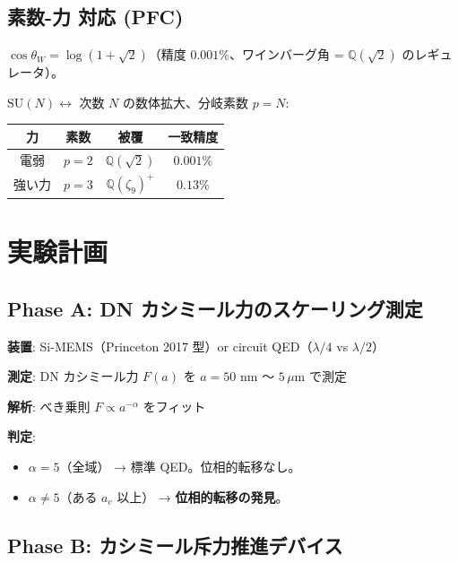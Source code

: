 \documentclass[11pt,a4paper]{article}
\begin{document}
\subsection{素数-力 対応 (PFC)}

\begin{resultbox}[数値的発見]
$\cos\theta_W = \log(1+\sqrt{2})$（精度 $0.001\%$、ワインバーグ角 = $\mathbb{Q}(\sqrt{2})$ のレギュレータ）。

$\mathrm{SU}(N) \leftrightarrow$ 次数 $N$ の数体拡大、分岐素数 $p = N$:
\begin{center}
\begin{tabular}{cccc}
\toprule
力 & 素数 & 被覆 & 一致精度 \\
\midrule
電弱 & $p=2$ & $\mathbb{Q}(\sqrt{2})$ & $0.001\%$ \\
強い力 & $p=3$ & $\mathbb{Q}(\zeta_9)^+$ & $0.13\%$ \\
\bottomrule
\end{tabular}
\end{center}
\end{resultbox}

\section{実験計画}

\subsection{Phase A: DN カシミール力のスケーリング測定}

\begin{techbox}[最重要実験]
\textbf{装置}: Si-MEMS（Princeton 2017 型）or circuit QED（$\lambda/4$ vs $\lambda/2$）

\textbf{測定}: DN カシミール力 $F(a)$ を $a = 50$ nm 〜 $5\,\mu$m で測定

\textbf{解析}: べき乗則 $F \propto a^{-\alpha}$ をフィット

\textbf{判定}:
\begin{itemize}
\item $\alpha = 5$（全域） → 標準 QED。位相的転移なし。
\item $\alpha \neq 5$（ある $a_c$ 以上） → \textbf{位相的転移の発見}。
\end{itemize}
\end{techbox}

\subsection{Phase B: カシミール斥力推進デバイス}
\end{document}
